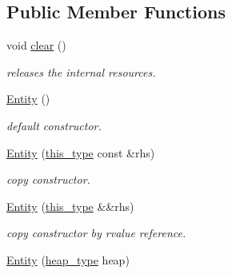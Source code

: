\subsection*{Public Member Functions}
\begin{DoxyCompactItemize}
\item 
\hypertarget{classhryky_1_1uri_1_1_entity_a5f70dc7061bc6066b1d5e085de92528b}{void \hyperlink{classhryky_1_1uri_1_1_entity_a5f70dc7061bc6066b1d5e085de92528b}{clear} ()}\label{classhryky_1_1uri_1_1_entity_a5f70dc7061bc6066b1d5e085de92528b}

\begin{DoxyCompactList}\small\item\em releases the internal resources. \end{DoxyCompactList}\item 
\hypertarget{classhryky_1_1uri_1_1_entity_a45301ce71f9f0072e8a5ec19c46afa02}{\hyperlink{classhryky_1_1uri_1_1_entity_a45301ce71f9f0072e8a5ec19c46afa02}{Entity} ()}\label{classhryky_1_1uri_1_1_entity_a45301ce71f9f0072e8a5ec19c46afa02}

\begin{DoxyCompactList}\small\item\em default constructor. \end{DoxyCompactList}\item 
\hypertarget{classhryky_1_1uri_1_1_entity_a1ce8423560f75649c9b8cab1e32d6a29}{\hyperlink{classhryky_1_1uri_1_1_entity_a1ce8423560f75649c9b8cab1e32d6a29}{Entity} (\hyperlink{classhryky_1_1uri_1_1_entity_ab22b480936b068a0cbe702a2d4345f90}{this\-\_\-type} const \&rhs)}\label{classhryky_1_1uri_1_1_entity_a1ce8423560f75649c9b8cab1e32d6a29}

\begin{DoxyCompactList}\small\item\em copy constructor. \end{DoxyCompactList}\item 
\hypertarget{classhryky_1_1uri_1_1_entity_a915c8af0da734a4662c394c38a08ccb8}{\hyperlink{classhryky_1_1uri_1_1_entity_a915c8af0da734a4662c394c38a08ccb8}{Entity} (\hyperlink{classhryky_1_1uri_1_1_entity_ab22b480936b068a0cbe702a2d4345f90}{this\-\_\-type} \&\&rhs)}\label{classhryky_1_1uri_1_1_entity_a915c8af0da734a4662c394c38a08ccb8}

\begin{DoxyCompactList}\small\item\em copy constructor by rvalue reference. \end{DoxyCompactList}\item 
\hypertarget{classhryky_1_1uri_1_1_entity_a0e84102248d70a7dc290f25d190d668d}{\hyperlink{classhryky_1_1uri_1_1_entity_a0e84102248d70a7dc290f25d190d668d}{Entity} (\hyperlink{classhryky_1_1memory_1_1heap_1_1_base}{heap\-\_\-type} heap)}\label{classhryky_1_1uri_1_1_entity_a0e84102248d70a7dc290f25d190d668d}


\end{DoxyCompactItemize}
